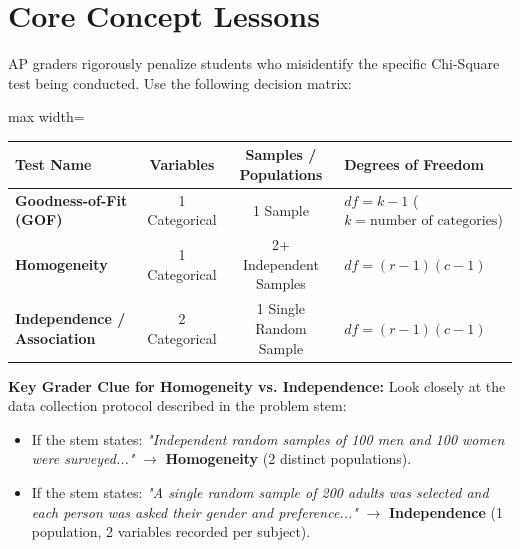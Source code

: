 \section{Core Concept Lessons}

\begin{lessonbox}
AP graders rigorously penalize students who misidentify the specific Chi-Square test being conducted. Use the following decision matrix:
\begin{center}
\begin{adjustbox}{max width=\linewidth}
\begin{tabular}{lccl}
\toprule
\textbf{Test Name} & \textbf{Variables} & \textbf{Samples / Populations} & \textbf{Degrees of Freedom} \\
\midrule
\textbf{Goodness-of-Fit (GOF)} & 1 Categorical & 1 Sample & $df = k - 1$ ($k = \text{number of categories}$) \\
\textbf{Homogeneity} & 1 Categorical & 2+ Independent Samples & $df = (r - 1)(c - 1)$ \\
\textbf{Independence / Association} & 2 Categorical & 1 Single Random Sample & $df = (r - 1)(c - 1)$ \\
\bottomrule
\end{tabular}
\end{adjustbox}
\end{center}
\textbf{Key Grader Clue for Homogeneity vs. Independence:} Look closely at the data collection protocol described in the problem stem:
\begin{itemize}
  \item If the stem states: \textit{"Independent random samples of 100 men and 100 women were surveyed..."} $\to$ \textbf{Homogeneity} (2 distinct populations).
  \item If the stem states: \textit{"A single random sample of 200 adults was selected and each person was asked their gender and preference..."} $\to$ \textbf{Independence} (1 population, 2 variables recorded per subject).
\end{itemize}
\end{lessonbox}

